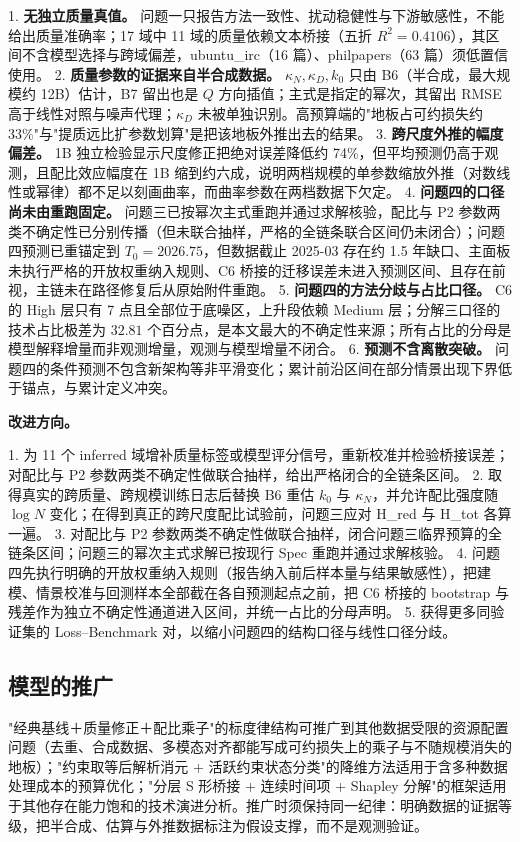 1. \textbf{无独立质量真值。} 问题一只报告方法一致性、扰动稳健性与下游敏感性，不能给出质量准确率；17 域中 11 域的质量依赖文本桥接（五折 $R^2=0.4106$），其区间不含模型选择与跨域偏差，ubuntu\_irc（16 篇）、philpapers（63 篇）须低置信使用。
2. \textbf{质量参数的证据来自半合成数据。} $\kappa_N,\kappa_D,k_0$ 只由 B6（半合成，最大规模约 12B）估计，B7 留出也是 $Q$ 方向插值；主式是指定的幂次，其留出 RMSE 高于线性对照与噪声代理；$\kappa_D$ 未被单独识别。高预算端的"地板占可约损失约 $33\%$"与"提质远比扩参数划算"是把该地板外推出去的结果。
3. \textbf{跨尺度外推的幅度偏差。} 1B 独立检验显示尺度修正把绝对误差降低约 74\%，但平均预测仍高于观测，且配比效应幅度在 1B 缩到约六成，说明两档规模的单参数缩放外推（对数线性或幂律）都不足以刻画曲率，而曲率参数在两档数据下欠定。
4. \textbf{问题四的口径尚未由重跑固定。} 问题三已按幂次主式重跑并通过求解核验，配比与 P2 参数两类不确定性已分别传播（但未联合抽样，严格的全链条联合区间仍未闭合）；问题四预测已重锚定到 $T_0=2026.75$，但数据截止 2025-03 存在约 1.5 年缺口、主面板未执行严格的开放权重纳入规则、C6 桥接的迁移误差未进入预测区间、且存在前视，主链未在路径修复后从原始附件重跑。
5. \textbf{问题四的方法分歧与占比口径。} C6 的 High 层只有 7 点且全部位于底噪区，上升段依赖 Medium 层；分解三口径的技术占比极差为 $32.81$ 个百分点，是本文最大的不确定性来源；所有占比的分母是模型解释增量而非观测增量，观测与模型增量不闭合。
6. \textbf{预测不含离散突破。} 问题四的条件预测不包含新架构等非平滑变化；累计前沿区间在部分情景出现下界低于锚点，与累计定义冲突。

\textbf{改进方向。}

1. 为 11 个 inferred 域增补质量标签或模型评分信号，重新校准并检验桥接误差；对配比与 P2 参数两类不确定性做联合抽样，给出严格闭合的全链条区间。
2. 取得真实的跨质量、跨规模训练日志后替换 B6 重估 $k_0$ 与 $\kappa_N$，并允许配比强度随 $\log N$ 变化；在得到真正的跨尺度配比试验前，问题三应对 H\_red 与 H\_tot 各算一遍。
3. 对配比与 P2 参数两类不确定性做联合抽样，闭合问题三临界预算的全链条区间；问题三的幂次主式求解已按现行 Spec 重跑并通过求解核验。
4. 问题四先执行明确的开放权重纳入规则（报告纳入前后样本量与结果敏感性），把建模、情景校准与回测样本全部截在各自预测起点之前，把 C6 桥接的 bootstrap 与残差作为独立不确定性通道进入区间，并统一占比的分母声明。
5. 获得更多同验证集的 Loss–Benchmark 对，以缩小问题四的结构口径与线性口径分歧。

\subsection{模型的推广}
\label{sec:7.3}

"经典基线＋质量修正＋配比乘子"的标度律结构可推广到其他数据受限的资源配置问题（去重、合成数据、多模态对齐都能写成可约损失上的乘子与不随规模消失的地板）；"约束取等后解析消元 + 活跃约束状态分类"的降维方法适用于含多种数据处理成本的预算优化；"分层 S 形桥接 + 连续时间项 + Shapley 分解"的框架适用于其他存在能力饱和的技术演进分析。推广时须保持同一纪律：明确数据的证据等级，把半合成、估算与外推数据标注为假设支撑，而不是观测验证。

